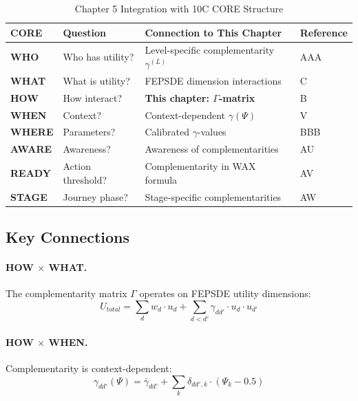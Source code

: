 \begin{table}[htbp]
\centering
\caption{Chapter 5 Integration with 10C CORE Structure}
\label{tab:ch5-9c-integration}
\small
\renewcommand{\arraystretch}{1.3}
\begin{tabular}{@{}llp{5cm}l@{}}
\toprule
\textbf{CORE} & \textbf{Question} & \textbf{Connection to This Chapter} & \textbf{Reference} \\
\midrule
\cellcolor{purple!20}\textbf{WHO} & Who has utility? & Level-specific complementarity $\gamma^{(L)}$ & AAA \\
\cellcolor{red!20}\textbf{WHAT} & What is utility? & FEPSDE dimension interactions & C \\
\cellcolor{blue!20}\textbf{HOW} & How interact? & \textbf{This chapter: $\Gamma$-matrix} & B \\
\cellcolor{green!20}\textbf{WHEN} & Context? & Context-dependent $\gamma(\Psi)$ & V \\
\cellcolor{gray!20}\textbf{WHERE} & Parameters? & Calibrated $\gamma$-values & BBB \\
\cellcolor{orange!20}\textbf{AWARE} & Awareness? & Awareness of complementarities & AU \\
\cellcolor{violet!20}\textbf{READY} & Action threshold? & Complementarity in WAX formula & AV \\
\cellcolor{teal!20}\textbf{STAGE} & Journey phase? & Stage-specific complementarities & AW \\
\bottomrule
\end{tabular}
\end{table}

\subsection{Key Connections}

\paragraph{HOW $\times$ WHAT.}
The complementarity matrix $\Gamma$ operates on FEPSDE utility dimensions:
\begin{equation}
U_{total} = \sum_d w_d \cdot u_d + \sum_{d < d'} \gamma_{dd'} \cdot u_d \cdot u_{d'}
\end{equation}

\paragraph{HOW $\times$ WHEN.}
Complementarity is context-dependent:
\begin{equation}
\gamma_{dd'}(\Psi) = \bar{\gamma}_{dd'} + \sum_k \delta_{dd',k} \cdot (\Psi_k - 0.5)
\end{equation}

